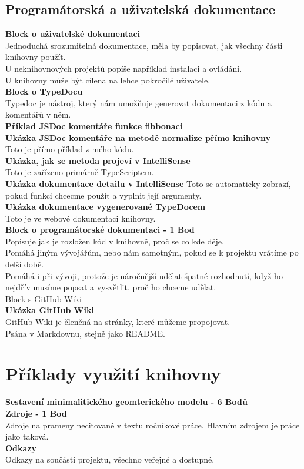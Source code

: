 {  \subsection {Programátorská a uživatelská dokumentace}
  \textbf{Block o uživatelské dokumentaci} \\
  Jednoduchá srozumitelná dokumentace, měla by popisovat, jak všechny části knihovny použít. \\
  U neknihovnových projektů popíše například instalaci a ovládání. \\
  U knihovny může být cílena na lehce pokročilé uživatele. \\
  \textbf{Block o TypeDocu} \\
  Typedoc je nástroj, který nám umožňuje generovat dokumentaci z kódu a komentářů v něm. \\
  \textbf{Příklad JSDoc komentáře funkce fibbonaci} \\
  \textbf{Ukázka JSDoc komentáře na metodě normalize přímo knihovny} \\
  Toto je přímo příklad z mého kódu. \\
  \textbf{Ukázka, jak se metoda projeví v IntelliSense} \\
  Toto je zařízeno primárně TypeScriptem. \\
  \textbf{Ukázka dokumentace detailu v IntelliSense}
  Toto se automaticky zobrazí, pokud funkci chcecme použít a vyplnit její argumenty. \\
  \textbf{Ukázka dokumentace vygenerované TypeDocem} \\
  Toto je ve webové dokumentaci knihovny. \\
  \textbf{Block o programátorské dokumentaci - 1 Bod} \\
  Popisuje jak je rozložen kód v knihovně, proč se co kde děje. \\
  Pomáhá jiným vývojářům, nebo nám samotným, pokud se k projektu vrátíme po delší době. \\
  Pomáhá i při vývoji, protože je náročnější udělat špatné rozhodnutí, když ho nejdřív musíme popsat a vysvětlit, proč ho chceme udělat. \\
  Block s GitHub Wiki \\
  \textbf{Ukázka GitHub Wiki} \\
  GitHub Wiki je členěná na stránky, které můžeme propojovat. \\
  Psána v Markdownu, stejně jako README. \\
 }
\section{Příklady využití knihovny} {
  \textbf{Sestavení minimalitického geomterického modelu - 6 Bodů} \\

 }
\textbf{Zdroje - 1 Bod} \\
Zdroje na prameny necitované v textu ročníkové práce. Hlavním zdrojem je práce jako taková. \\
\textbf{Odkazy} \\
Odkazy na součásti projektu, všechno veřejné a dostupné. \\
